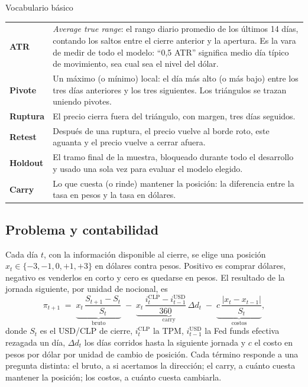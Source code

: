 \documentclass[10pt,a4paper]{article}
\begin{document}
\begin{recuadro}{Vocabulario básico}
\renewcommand{\arraystretch}{1.1}
\begin{tabularx}{\linewidth}{@{}>{\bfseries}p{2.6cm}X@{}}
ATR & \emph{Average true range}: el rango diario promedio de los últimos 14 días, contando los saltos entre el cierre anterior y la apertura. Es
  la vara de medir de todo el modelo: ``0,5 ATR'' significa medio día típico de
  movimiento, sea cual sea el nivel del dólar. \\
Pivote & Un máximo (o mínimo) local: el día más alto (o más bajo) entre los tres días
  anteriores y los tres siguientes. Los triángulos se trazan uniendo pivotes. \\
Ruptura & El precio cierra fuera del triángulo, con margen, tres días seguidos. \\
Retest & Después de una ruptura, el precio vuelve al borde roto, este aguanta y el
  precio vuelve a cerrar afuera. \\
Holdout & El tramo final de la muestra, bloqueado durante todo el desarrollo y usado
  una sola vez para evaluar el modelo elegido. \\
Carry & Lo que cuesta (o rinde) mantener la posición: la diferencia entre la tasa en
  pesos y la tasa en dólares. \\
\end{tabularx}
\end{recuadro}

\subsection{Problema y contabilidad}\label{sec:reglas}

Cada día $t$, con la información disponible al cierre, se elige una posición
$x_t\in\{-3,-1,0,+1,+3\}$ en dólares contra pesos. Positivo es comprar dólares,
negativo es venderlos en corto y cero es quedarse en pesos. El resultado de la jornada
siguiente, por unidad de nocional, es
\begin{equation}\label{eq:pnl}
  \pi_{t+1} \;=\;
  \underbrace{x_t\,\frac{S_{t+1}-S_t}{S_t}}_{\text{bruto}}
  \;-\;
  \underbrace{x_t\,\frac{i^{\text{CLP}}_t - i^{\text{USD}}_{t-1}}{360}\,\Delta d_{t}}_{\text{carry}}
  \;-\;
  \underbrace{c\,\frac{|x_t - x_{t-1}|}{S_t}}_{\text{costos}},
\end{equation}
donde $S_t$ es el USD/CLP de cierre, $i^{\text{CLP}}_t$ la TPM, $i^{\text{USD}}_{t-1}$
la Fed funds efectiva rezagada un día, $\Delta d_t$ los días corridos hasta la siguiente
jornada y $c$ el costo en pesos por dólar por unidad de cambio de posición. Cada término
responde a una pregunta distinta: el bruto, a si acertamos la dirección; el carry, a
cuánto cuesta mantener la posición; los costos, a cuánto cuesta cambiarla.
\end{document}
